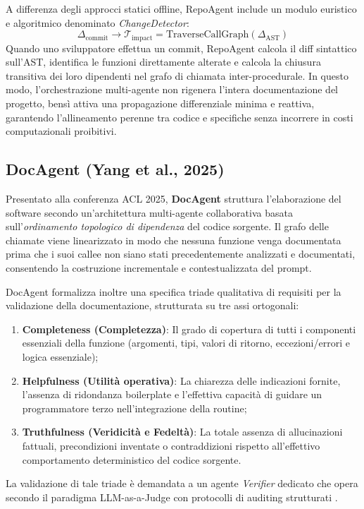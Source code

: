 A differenza degli approcci statici offline, RepoAgent include un modulo euristico e algoritmico denominato \emph{ChangeDetector}:
\begin{equation}
    \Delta_{\mathrm{commit}} \longrightarrow \mathcal{T}_{\mathrm{impact}} = \mathrm{TraverseCallGraph}(\Delta_{\mathrm{AST}})
    \label{eq:repoagent_impact}
\end{equation}
Quando uno sviluppatore effettua un commit, RepoAgent calcola il diff sintattico sull'AST, identifica le funzioni direttamente alterate e calcola la chiusura transitiva dei loro dipendenti nel grafo di chiamata inter-procedurale. In questo modo, l'orchestrazione multi-agente non rigenera l'intera documentazione del progetto, bensì attiva una propagazione differenziale minima e reattiva, garantendo l'allineamento perenne tra codice e specifiche senza incorrere in costi computazionali proibitivi.

\subsection{DocAgent (Yang et al., 2025)}
\label{subsec:docagent}
Presentato alla conferenza ACL 2025, \textbf{DocAgent} \cite{yang_docagent_2025} struttura l'elaborazione del software secondo un'architettura multi-agente collaborativa basata sull'\emph{ordinamento topologico di dipendenza} del codice sorgente. Il grafo delle chiamate viene linearizzato in modo che nessuna funzione venga documentata prima che i suoi callee non siano stati precedentemente analizzati e documentati, consentendo la costruzione incrementale e contestualizzata del prompt.

DocAgent formalizza inoltre una specifica triade qualitativa di requisiti per la validazione della documentazione, strutturata su tre assi ortogonali:
\begin{enumerate}
    \item \textbf{Completeness (Completezza)}: Il grado di copertura di tutti i componenti essenziali della funzione (argomenti, tipi, valori di ritorno, eccezioni/errori e logica essenziale);
    \item \textbf{Helpfulness (Utilità operativa)}: La chiarezza delle indicazioni fornite, l'assenza di ridondanza boilerplate e l'effettiva capacità di guidare un programmatore terzo nell'integrazione della routine;
    \item \textbf{Truthfulness (Veridicità e Fedeltà)}: La totale assenza di allucinazioni fattuali, precondizioni inventate o contraddizioni rispetto all'effettivo comportamento deterministico del codice sorgente.
\end{enumerate}
La validazione di tale triade è demandata a un agente \emph{Verifier} dedicato che opera secondo il paradigma LLM-as-a-Judge con protocolli di auditing strutturati \cite{wu_can_2024,liu_g-eval_2023,zhu_judgelm_2025}.


